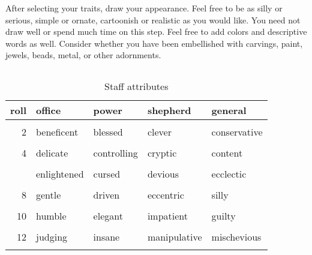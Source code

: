 \documentclass[
  a5paper,
]{article}
\begin{document}
After selecting your traits, draw your appearance. Feel free to be as silly or serious, simple or ornate, cartoonish or realistic as you would like. You need not draw well or spend much time on this step. Feel free to add colors and descriptive words as well. Consider whether you have been embellished with carvings, paint, jewels, beads, metal, or other adornments.

\pagebreak

\(~\)

\begin{table}

\caption{\label{tab:attr}Staff attributes}
\centering
\fontsize{9}{11}\selectfont
\begin{tabular}[t]{rllll}
\toprule
\textbf{roll} & \textbf{office} & \textbf{power} & \textbf{shepherd} & \textbf{general}\\
\midrule
\cellcolor{gray!6}{1} & \cellcolor{gray!6}{alluring} & \cellcolor{gray!6}{aggressive} & \cellcolor{gray!6}{adaptable} & \cellcolor{gray!6}{liberating}\\
2 & beneficent & blessed & clever & conservative\\
\cellcolor{gray!6}{3} & \cellcolor{gray!6}{cruel} & \cellcolor{gray!6}{capricious} & \cellcolor{gray!6}{compassionate} & \cellcolor{gray!6}{radical}\\
4 & delicate & controlling & cryptic & content\\
\cellcolor{gray!6}{5} & \cellcolor{gray!6}{discerning} & \cellcolor{gray!6}{curious} & \cellcolor{gray!6}{destined} & \cellcolor{gray!6}{serene}\\
\addlinespace
6 & enlightened & cursed & devious & ecclectic\\
\cellcolor{gray!6}{7} & \cellcolor{gray!6}{folksy} & \cellcolor{gray!6}{divine} & \cellcolor{gray!6}{doomed} & \cellcolor{gray!6}{quirky}\\
8 & gentle & driven & eccentric & silly\\
\cellcolor{gray!6}{9} & \cellcolor{gray!6}{healing} & \cellcolor{gray!6}{eager} & \cellcolor{gray!6}{haunted} & \cellcolor{gray!6}{ridiculous}\\
10 & humble & elegant & impatient & guilty\\
\addlinespace
\cellcolor{gray!6}{11} & \cellcolor{gray!6}{inspiring} & \cellcolor{gray!6}{horrific} & \cellcolor{gray!6}{isolating} & \cellcolor{gray!6}{beguiling}\\
12 & judging & insane & manipulative & mischevious\\
\cellcolor{gray!6}{13} & \cellcolor{gray!6}{loyal} & \cellcolor{gray!6}{ornery} & \cellcolor{gray!6}{obedient} & \cellcolor{gray!6}{beloved}\\

\end{tabular}
\end{table}
\end{document}
